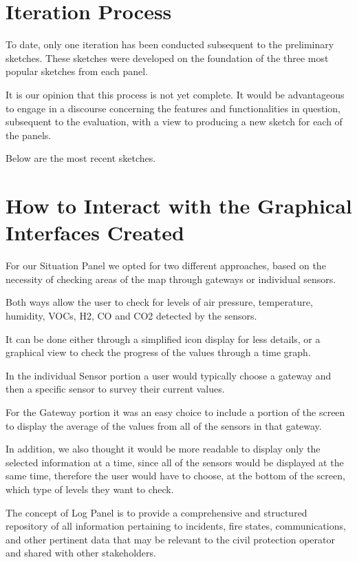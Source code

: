 \section{Iteration Process}
To date, only one iteration has been conducted subsequent to the preliminary sketches. These sketches were developed on the foundation of the three most popular sketches from each panel. \par
It is our opinion that this process is not yet complete. It would be advantageous to engage in a discourse concerning the features and functionalities in question, subsequent to the evaluation, with a view to producing a new sketch for each of the panels. \par
Below are the most recent sketches. \par

\section{How to Interact with the Graphical Interfaces Created}
For our Situation Panel we opted for two different approaches, based on the necessity of checking areas of the map through gateways or individual sensors. \par
Both ways allow the user to check for levels of air pressure, temperature, humidity, VOCs, H2, CO and CO2 detected by the sensors. \par
It can be done either through a simplified icon display for less details, or a graphical view to check the progress of the values through a time graph. \par
In the individual Sensor portion a user would typically choose a gateway and then a specific sensor to survey their current values. \par
For the Gateway portion it was an easy choice to include a portion of the screen to display the average of the values from all of the sensors in that gateway. \par
In addition, we also thought it would be more readable to display only the selected information at a time, since all of the sensors would be displayed at the same time, therefore the user would have to choose, at the bottom of the screen, which type of levels they want to check. \par
The concept of Log Panel is to provide a comprehensive and structured repository of all information pertaining to incidents, fire states, communications, and other pertinent data that may be relevant to the civil protection operator and shared with other stakeholders. \par
